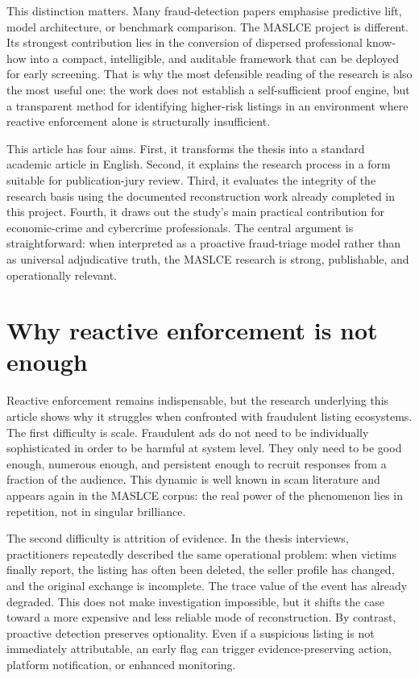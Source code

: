 \documentclass[11pt,a4paper]{article}
\begin{document}
This distinction matters. Many fraud-detection papers emphasise predictive lift, model architecture, or benchmark comparison. The MASLCE project is different. Its strongest contribution lies in the conversion of dispersed professional know-how into a compact, intelligible, and auditable framework that can be deployed for early screening. That is why the most defensible reading of the research is also the most useful one: the work does not establish a self-sufficient proof engine, but a transparent method for identifying higher-risk listings in an environment where reactive enforcement alone is structurally insufficient.

This article has four aims. First, it transforms the thesis into a standard academic article in English. Second, it explains the research process in a form suitable for publication-jury review. Third, it evaluates the integrity of the research basis using the documented reconstruction work already completed in this project. Fourth, it draws out the study's main practical contribution for economic-crime and cybercrime professionals. The central argument is straightforward: when interpreted as a proactive fraud-triage model rather than as universal adjudicative truth, the MASLCE research is strong, publishable, and operationally relevant.

\section{Why reactive enforcement is not enough}
Reactive enforcement remains indispensable, but the research underlying this article shows why it struggles when confronted with fraudulent listing ecosystems. The first difficulty is scale. Fraudulent ads do not need to be individually sophisticated in order to be harmful at system level. They only need to be good enough, numerous enough, and persistent enough to recruit responses from a fraction of the audience. This dynamic is well known in scam literature and appears again in the MASLCE corpus: the real power of the phenomenon lies in repetition, not in singular brilliance.

The second difficulty is attrition of evidence. In the thesis interviews, practitioners repeatedly described the same operational problem: when victims finally report, the listing has often been deleted, the seller profile has changed, and the original exchange is incomplete. The trace value of the event has already degraded. This does not make investigation impossible, but it shifts the case toward a more expensive and less reliable mode of reconstruction. By contrast, proactive detection preserves optionality. Even if a suspicious listing is not immediately attributable, an early flag can trigger evidence-preserving action, platform notification, or enhanced monitoring.
\end{document}
